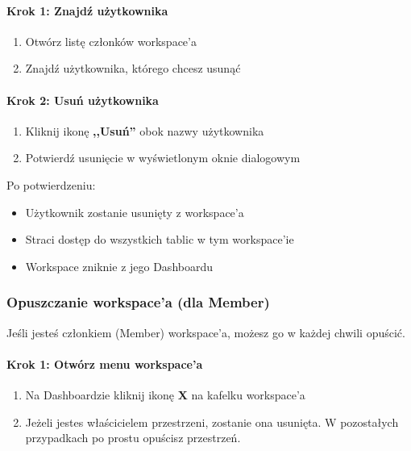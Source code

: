 \documentclass[12pt,a4paper]{article}
\begin{document}
\paragraph{Krok 1: Znajdź użytkownika}

\begin{enumerate}
    \item Otwórz listę członków workspace'a
    \item Znajdź użytkownika, którego chcesz usunąć
\end{enumerate}

\paragraph{Krok 2: Usuń użytkownika}

\begin{enumerate}
    \item Kliknij ikonę \textbf{,,Usuń''} obok nazwy użytkownika
    \item Potwierdź usunięcie w wyświetlonym oknie dialogowym
\end{enumerate}

Po potwierdzeniu:
\begin{itemize}
    \item Użytkownik zostanie usunięty z workspace'a
    \item Straci dostęp do wszystkich tablic w tym workspace'ie
    \item Workspace zniknie z jego Dashboardu
\end{itemize}

\subsubsection{Opuszczanie workspace'a (dla Member)}

Jeśli jesteś członkiem (Member) workspace'a, możesz go w każdej chwili opuścić.

\paragraph{Krok 1: Otwórz menu workspace'a}

\begin{enumerate}
    \item Na Dashboardzie kliknij ikonę \textbf{X} na kafelku workspace'a
    \item Jeżeli jestes właścicielem przestrzeni, zostanie ona usunięta. W pozostałych przypadkach po prostu opuścisz przestrzeń.
\end{enumerate}
\end{document}

